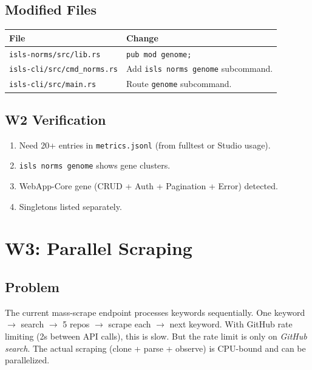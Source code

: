 \documentclass[11pt,a4paper]{article}
\begin{document}
\subsection{Modified Files}

\begin{longtable}{lp{10cm}}
\toprule
\textbf{File} & \textbf{Change} \\
\midrule
\texttt{isls-norms/src/lib.rs}
  & \texttt{pub mod genome;} \\
\texttt{isls-cli/src/cmd\_norms.rs}
  & Add \texttt{isls norms genome} subcommand. \\
\texttt{isls-cli/src/main.rs}
  & Route \texttt{genome} subcommand. \\
\bottomrule
\end{longtable}

\subsection{W2 Verification}

\begin{enumerate}[nosep]
\item Need 20+ entries in \texttt{metrics.jsonl} (from fulltest 
      or Studio usage).
\item \texttt{isls norms genome} shows gene clusters.
\item WebApp-Core gene (CRUD + Auth + Pagination + Error) detected.
\item Singletons listed separately.
\end{enumerate}


\section{W3: Parallel Scraping}
\label{sec:w3}

\subsection{Problem}

The current mass-scrape endpoint processes keywords sequentially. 
One keyword $\to$ search $\to$ 5 repos $\to$ scrape each $\to$ 
next keyword. With GitHub rate limiting (2s between API calls), 
this is slow. But the rate limit is only on \emph{GitHub search}. 
The actual scraping (clone + parse + observe) is CPU-bound and 
can be parallelized.
\end{document}
